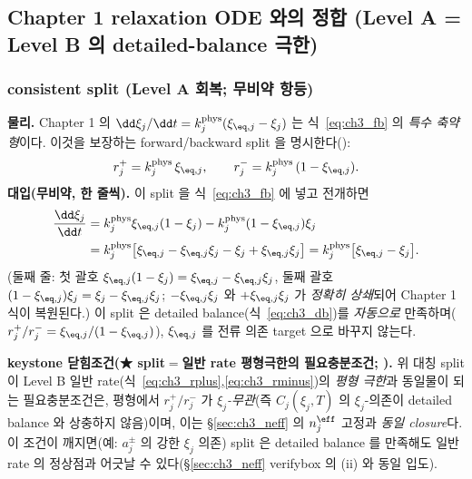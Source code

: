 \subsection{Chapter 1 relaxation ODE 와의 정합 (Level A = Level B 의 detailed-balance 극한)}\label{sec:ch3_consistency}
\subsubsection{consistent split (Level A 회복; 무비약 항등)}\label{sec:ch3_split}
\textbf{물리.} Chapter 1 의 $\dd\xi_j/\dd t=k_j^{\mathrm{phys}}(\xi_{\eq,j}-\xi_j)$ 는 식~\eqref{eq:ch3_fb} 의
\emph{특수 축약형}이다. 이것을 보장하는 forward/backward split 을 명시한다():
\begin{equation}
r_j^+=k_j^{\mathrm{phys}}\,\xi_{\eq,j},\qquad r_j^-=k_j^{\mathrm{phys}}\,(1-\xi_{\eq,j}).
\label{eq:ch3_split}
\end{equation}
\textbf{대입(무비약, 한 줄씩).} 이 split 을 식~\eqref{eq:ch3_fb} 에 넣고 전개하면
\begin{align}
\frac{\dd\xi_j}{\dd t}
&=k_j^{\mathrm{phys}}\xi_{\eq,j}(1-\xi_j)-k_j^{\mathrm{phys}}(1-\xi_{\eq,j})\xi_j \notag\\
&=k_j^{\mathrm{phys}}\big[\xi_{\eq,j}-\xi_{\eq,j}\xi_j-\xi_j+\xi_{\eq,j}\xi_j\big]
=k_j^{\mathrm{phys}}\big[\xi_{\eq,j}-\xi_j\big].
\label{eq:ch3_recover}
\end{align}
(둘째 줄: 첫 괄호 $\xi_{\eq,j}(1-\xi_j)=\xi_{\eq,j}-\xi_{\eq,j}\xi_j$, 둘째 괄호 $(1-\xi_{\eq,j})\xi_j=\xi_j-\xi_{\eq,j}\xi_j$;
$-\xi_{\eq,j}\xi_j$ 와 $+\xi_{\eq,j}\xi_j$ 가 \emph{정확히 상쇄}되어 Chapter 1 식이 복원된다.) 이 split 은
detailed balance(식~\eqref{eq:ch3_db})를 \emph{자동으로} 만족하며($r_j^+/r_j^-=\xi_{\eq,j}/(1-\xi_{\eq,j})$),
$\xi_{\eq,j}$ 를 전류 의존 target 으로 바꾸지 않는다.
\begin{boundbox}
\textbf{keystone 닫힘조건(★ split$=$일반 rate 평형극한의 필요충분조건; ).} 위 대칭 split 이 Level B
일반 rate(식~\eqref{eq:ch3_rplus},\allowbreak\eqref{eq:ch3_rminus})의 \emph{평형 극한}과 동일물이 되는 필요충분조건은,
평형에서 $r_j^+/r_j^-$ 가 \emph{$\xi_j$-무관}(즉 $C_j(\xi_j,T)$ 의 $\xi_j$-의존이 detailed balance 와 상충하지
않음)이며, 이는 \S\ref{sec:ch3_neff} 의 $n_j^{\eff}$ 고정과 \emph{동일 closure}다. 이 조건이 깨지면(예: $a_j^\pm$ 의
강한 $\xi_j$ 의존) split 은 detailed balance 를 만족해도 일반 rate 의 정상점과 어긋날 수 있다(\S\ref{sec:ch3_neff}
verifybox 의 (ii) 와 동일 입도).
\end{boundbox}

